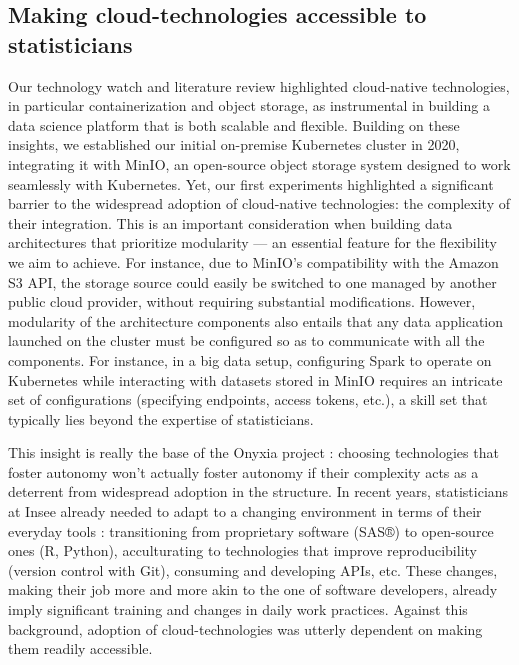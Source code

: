 \documentclass[graybox]{svmult}
\begin{document}
\subsection{Making cloud-technologies accessible to statisticians}

Our technology watch and literature review highlighted cloud-native technologies, in particular containerization and object storage, as instrumental in building a data science platform that is both scalable and flexible. Building on these insights, we established our initial on-premise Kubernetes cluster in 2020, integrating it with MinIO, an open-source object storage system designed to work seamlessly with Kubernetes. Yet, our first experiments highlighted a significant barrier to the widespread adoption of cloud-native technologies: the complexity of their integration. This is an important consideration when building data architectures that prioritize modularity — an essential feature for the flexibility we aim to achieve. For instance, due to MinIO's compatibility with the Amazon S3 API, the storage source could easily be switched to  one managed by another public cloud provider, without requiring substantial modifications. However, modularity of the architecture components also entails that any data application launched on the cluster must be configured so as to communicate with all the components. For instance, in a big data setup, configuring Spark to operate on Kubernetes while interacting with datasets stored in MinIO requires an intricate set of configurations (specifying endpoints, access tokens, etc.), a skill set that typically lies beyond the expertise of statisticians.

This insight is really the base of the Onyxia project : choosing technologies that foster autonomy won't actually foster autonomy if their complexity acts as a deterrent from widespread adoption in the structure. In recent years, statisticians at Insee already needed to adapt to a changing environment in terms of their everyday tools : transitioning from proprietary software (SAS®) to open-source ones (R, Python), acculturating to technologies that improve reproducibility (version control with Git), consuming and developing APIs, etc. These changes, making their job more and more akin to the one of software developers, already imply significant training and changes in daily work practices. Against this background, adoption of cloud-technologies was utterly dependent on making them readily accessible.
\end{document}
